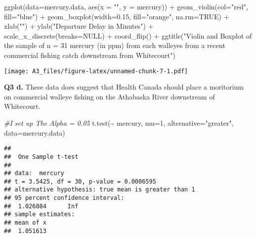 \documentclass[
]{article}
\newenvironment{Shaded}{\begin{snugshade}}{\end{snugshade}}
\newcommand{\AttributeTok}[1]{\textcolor[rgb]{0.77,0.63,0.00}{#1}}
\newcommand{\CommentTok}[1]{\textcolor[rgb]{0.56,0.35,0.01}{\textit{#1}}}
\newcommand{\ConstantTok}[1]{\textcolor[rgb]{0.00,0.00,0.00}{#1}}
\newcommand{\DecValTok}[1]{\textcolor[rgb]{0.00,0.00,0.81}{#1}}
\newcommand{\FloatTok}[1]{\textcolor[rgb]{0.00,0.00,0.81}{#1}}
\newcommand{\FunctionTok}[1]{\textcolor[rgb]{0.00,0.00,0.00}{#1}}
\newcommand{\NormalTok}[1]{#1}
\newcommand{\SpecialCharTok}[1]{\textcolor[rgb]{0.00,0.00,0.00}{#1}}
\newcommand{\StringTok}[1]{\textcolor[rgb]{0.31,0.60,0.02}{#1}}
\begin{document}
\begin{Shaded}
\begin{Highlighting}[]
\FunctionTok{ggplot}\NormalTok{(}\AttributeTok{data=}\NormalTok{mercury.data, }\FunctionTok{aes}\NormalTok{(}\AttributeTok{x =} \StringTok{""}\NormalTok{, }\AttributeTok{y =}\NormalTok{ mercury)) }\SpecialCharTok{+} \FunctionTok{geom\_violin}\NormalTok{(}\AttributeTok{col=}\StringTok{"red"}\NormalTok{, }\AttributeTok{fill=}\StringTok{"blue"}\NormalTok{) }\SpecialCharTok{+} \FunctionTok{geom\_boxplot}\NormalTok{(}\AttributeTok{width=}\FloatTok{0.15}\NormalTok{, }\AttributeTok{fill=}\StringTok{"orange"}\NormalTok{, }\AttributeTok{na.rm=}\ConstantTok{TRUE}\NormalTok{) }\SpecialCharTok{+} \FunctionTok{xlab}\NormalTok{(}\StringTok{""}\NormalTok{) }\SpecialCharTok{+} \FunctionTok{ylab}\NormalTok{(}\StringTok{"Departure Delay in Minutes"}\NormalTok{) }\SpecialCharTok{+} \FunctionTok{scale\_x\_discrete}\NormalTok{(}\AttributeTok{breaks=}\ConstantTok{NULL}\NormalTok{) }\SpecialCharTok{+} \FunctionTok{coord\_flip}\NormalTok{() }\SpecialCharTok{+} \FunctionTok{ggtitle}\NormalTok{(}\StringTok{"Violin and Boxplot of the sample of n = 31 mercury (in ppm) from each walleyes from a recent commercial fishing catch downstream from Whitecourt"}\NormalTok{)}
\end{Highlighting}
\end{Shaded}

\texttt{[image: A3\_files/figure-latex/unnamed-chunk-7-1.pdf]}

\textbf{Q3 d.} These data does suggest that Health Canada should place a
moritorium on commercial walleye fishing on the Athabaska River
downstream of Whitecourt.

\begin{Shaded}
\begin{Highlighting}[]
\CommentTok{\#I set up The Alpha = 0.05}
\FunctionTok{t.test}\NormalTok{(}\SpecialCharTok{\textasciitilde{}}\NormalTok{ mercury, }\AttributeTok{mu=}\DecValTok{1}\NormalTok{, }\AttributeTok{alternative=}\StringTok{"greater"}\NormalTok{, }\AttributeTok{data=}\NormalTok{mercury.data)}
\end{Highlighting}
\end{Shaded}

\begin{verbatim}
## 
##  One Sample t-test
## 
## data:  mercury
## t = 3.5425, df = 30, p-value = 0.0006595
## alternative hypothesis: true mean is greater than 1
## 95 percent confidence interval:
##  1.026884      Inf
## sample estimates:
## mean of x 
##  1.051613
\end{verbatim}
\end{document}

